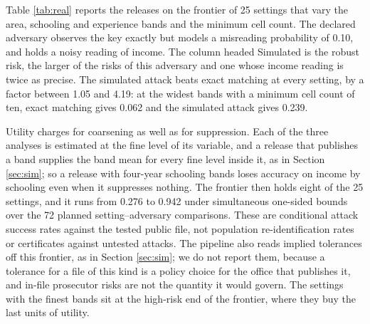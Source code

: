 \documentclass[11pt,a4paper]{article}
\theoremstyle{plain}
\theoremstyle{definition}
\theoremstyle{definition}
\theoremstyle{plain}
\begin{document}
Table \ref{tab:real} reports the releases on the frontier of 25 settings that vary
the area, schooling and experience bands and the minimum cell count. The declared
adversary observes the key exactly but models a misreading probability of 0.10,
and holds a noisy reading of income. The column headed Simulated is the robust
risk, the larger of the risks of this adversary and one whose income reading is
twice as precise. The simulated attack beats exact matching at every setting, by
a factor between 1.05 and 4.19: at the widest bands with a minimum cell count of
ten, exact matching gives 0.062 and the simulated attack gives 0.239.

Utility charges for coarsening as well as for suppression. Each of the three
analyses is estimated at the fine level of its variable, and a release that
publishes a band supplies the band mean for every fine level inside it, as in
Section \ref{sec:sim}; so a release with four-year schooling bands loses accuracy
on income by schooling even when it suppresses nothing. The frontier then holds
eight of the 25 settings, and it runs from 0.276 to 0.942 under simultaneous
one-sided bounds over the 72 planned setting--adversary comparisons. These are
conditional attack success rates against the tested public file, not population
re-identification rates or certificates against untested attacks. The
pipeline also reads implied tolerances off this frontier, as in Section
\ref{sec:sim}; we do not report them, because a tolerance for a file of this kind
is a policy choice for the office that publishes it, and in-file prosecutor risks
are not the quantity it would govern. The settings with the finest bands sit at
the high-risk end of the frontier, where they buy the last units of utility.


\end{document}

